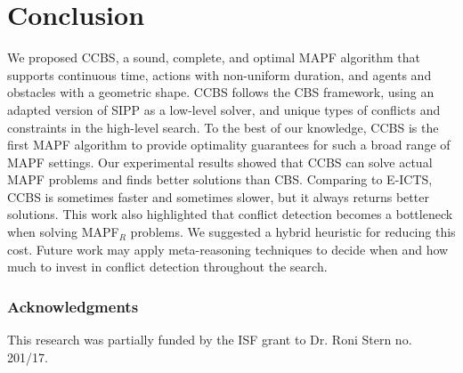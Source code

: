 \documentclass[review]{elsarticle}
\newcommand{\ccbs}{\ac{CCBS}\xspace}
\newcommand{\cbs}{\ac{CBS}\xspace}
\newcommand{\sipp}{\ac{SIPP}\xspace}
\newcommand{\mapfr}{\ac{MAPF}$_R$\xspace}
\newcommand{\mapf}{\ac{MAPF}\xspace}
\begin{document}
\section{Conclusion}



We proposed \ccbs, a sound, complete, and optimal \mapf algorithm that supports continuous time, actions with non-uniform duration, and agents and obstacles with a geometric shape. 
\ccbs follows the \cbs framework, using an adapted version of \sipp as a low-level solver, and unique types of conflicts and constraints in the high-level search. 
To the best of our knowledge, \ccbs is the first \ac{MAPF} algorithm to provide optimality guarantees for such a broad range of \ac{MAPF} settings. 
Our experimental results showed that \ccbs can solve actual \ac{MAPF} problems and finds better solutions than \cbs. Comparing to E-ICTS, \ccbs is sometimes faster and sometimes slower, but it always returns better solutions.  
This work also highlighted that conflict detection becomes a bottleneck when solving \mapfr problems. We suggested a hybrid heuristic for reducing this cost. Future work may apply meta-reasoning techniques to decide when and how much to invest in conflict detection throughout the search. 











\subsubsection*{Acknowledgments}
This research was partially funded by the ISF grant to Dr. Roni Stern no. 201/17. 
\end{document}
